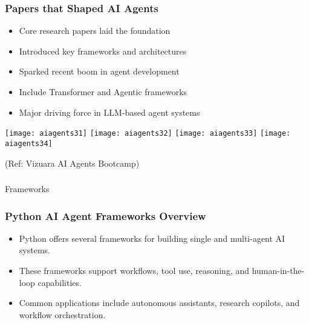 \begin{frame}[fragile]\frametitle{Papers that Shaped AI Agents}

      \begin{itemize}
        \item Core research papers laid the foundation
        \item Introduced key frameworks and architectures
        \item Sparked recent boom in agent development
        \item Include Transformer and Agentic frameworks
        \item Major driving force in LLM-based agent systems
      \end{itemize}

		\begin{center}
		\texttt{[image: aiagents31]}
		\texttt{[image: aiagents32]}
		\texttt{[image: aiagents33]}
		\texttt{[image: aiagents34]}
		
		{\tiny (Ref: Vizuara AI Agents Bootcamp)}
		\end{center}	
 
\end{frame}

\begin{frame}[fragile]\frametitle{}
\begin{center}
{\Large Frameworks}
\end{center}
\end{frame}

\begin{frame}[fragile]\frametitle{Python AI Agent Frameworks Overview}
    \begin{itemize}
        \item Python offers several frameworks for building single and multi-agent AI systems.
        \item These frameworks support workflows, tool use, reasoning, and human-in-the-loop capabilities.
        \item Common applications include autonomous assistants, research copilots, and workflow orchestration.
    \end{itemize}
\end{frame}

